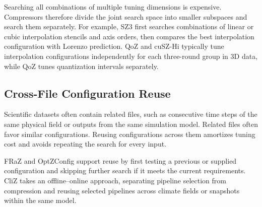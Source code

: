 Searching all combinations of multiple tuning dimensions is expensive. Compressors therefore divide the joint search space into smaller subspaces and search them separately. For example, SZ3 first searches combinations of linear or cubic interpolation stencils and axis orders, then compares the best interpolation configuration with Lorenzo prediction. QoZ and cuSZ-Hi typically tune interpolation configurations independently for each three-round group in 3D data, while QoZ tunes quantization intervals separately.

\subsection{Cross-File Configuration Reuse}
\label{sec:related-work:reuse}

Scientific datasets often contain related files, such as consecutive time steps of the same physical field or outputs from the same simulation model. Related files often favor similar configurations. Reusing configurations across them amortizes tuning cost and avoids repeating the search for every input.

FRaZ and OptZConfig support reuse by first testing a previous or supplied configuration and skipping further search if it meets the current requirements. CliZ takes an offline--online approach, separating pipeline selection from compression and reusing selected pipelines across climate fields or snapshots within the same model.

